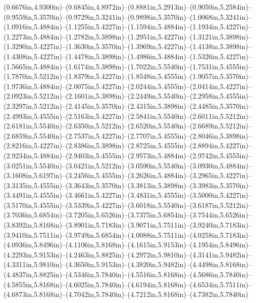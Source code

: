 (0.6676in,4.9300in)--(0.6845in,4.8972in)--(0.8881in,5.2913in)--(0.9050in,5.2584in)--(0.9559in,5.3570in)--(0.9729in,5.3241in)--(0.9898in,5.3570in)--(1.0068in,5.3241in)--(1.0916in,5.4884in)--(1.1255in,5.4227in)--(1.1594in,5.4884in)--(1.1934in,5.4227in)--(1.2273in,5.4884in)--(1.2782in,5.3898in)--(1.2951in,5.4227in)--(1.3121in,5.3898in)--(1.3290in,5.4227in)--(1.3630in,5.3570in)--(1.3969in,5.4227in)--(1.4138in,5.3898in)--(1.4308in,5.4227in)--(1.4478in,5.3898in)--(1.4986in,5.4884in)--(1.5326in,5.4227in)--(1.5665in,5.4884in)--(1.6174in,5.3898in)--(1.7022in,5.5540in)--(1.7531in,5.4555in)--(1.7870in,5.5212in)--(1.8379in,5.4227in)--(1.8548in,5.4555in)--(1.9057in,5.3570in)--(1.9736in,5.4884in)--(2.0075in,5.4227in)--(2.0244in,5.4555in)--(2.0414in,5.4227in)--(2.0923in,5.5212in)--(2.1601in,5.3898in)--(2.2449in,5.5540in)--(2.2958in,5.4555in)--(2.3297in,5.5212in)--(2.4145in,5.3570in)--(2.4315in,5.3898in)--(2.4485in,5.3570in)--(2.4993in,5.4555in)--(2.5163in,5.4227in)--(2.5841in,5.5540in)--(2.6011in,5.5212in)--(2.6181in,5.5540in)--(2.6350in,5.5212in)--(2.6520in,5.5540in)--(2.6689in,5.5212in)--(2.6859in,5.5540in)--(2.7537in,5.4227in)--(2.7707in,5.4555in)--(2.8046in,5.3898in)--(2.8216in,5.4227in)--(2.8386in,5.3898in)--(2.8725in,5.4555in)--(2.8894in,5.4227in)--(2.9234in,5.4884in)--(2.9403in,5.4555in)--(2.9573in,5.4884in)--(2.9742in,5.4555in)--(3.0251in,5.5540in)--(3.0421in,5.5212in)--(3.0590in,5.5540in)--(3.0930in,5.4884in)--(3.1608in,5.6197in)--(3.2456in,5.4555in)--(3.2626in,5.4884in)--(3.2965in,5.4227in)--(3.3135in,5.4555in)--(3.3643in,5.3570in)--(3.3813in,5.3898in)--(3.3983in,5.3570in)--(3.4491in,5.4555in)--(3.4661in,5.4227in)--(3.4831in,5.4555in)--(3.5000in,5.4227in)--(3.5170in,5.4555in)--(3.5339in,5.4227in)--(3.6018in,5.5540in)--(3.6187in,5.5212in)--(3.7036in,5.6854in)--(3.7205in,5.6526in)--(3.7375in,5.6854in)--(3.7544in,5.6526in)--(3.8392in,5.8168in)--(3.8901in,5.7183in)--(3.9071in,5.7511in)--(3.9240in,5.7183in)--(3.9410in,5.7511in)--(3.9749in,5.6854in)--(4.0088in,5.7511in)--(4.0258in,5.7183in)--(4.0936in,5.8496in)--(4.1106in,5.8168in)--(4.1615in,5.9153in)--(4.1954in,5.8496in)--(4.2293in,5.9153in)--(4.2463in,5.8825in)--(4.2972in,5.9810in)--(4.3141in,5.9482in)--(4.3311in,5.9810in)--(4.3650in,5.9153in)--(4.3820in,5.9482in)--(4.4498in,5.8168in)--(4.4837in,5.8825in)--(4.5346in,5.7840in)--(4.5516in,5.8168in)--(4.5686in,5.7840in)--(4.5855in,5.8168in)--(4.6025in,5.7840in)--(4.6194in,5.8168in)--(4.6534in,5.7511in)--(4.6873in,5.8168in)--(4.7042in,5.7840in)--(4.7212in,5.8168in)--(4.7382in,5.7840in)
